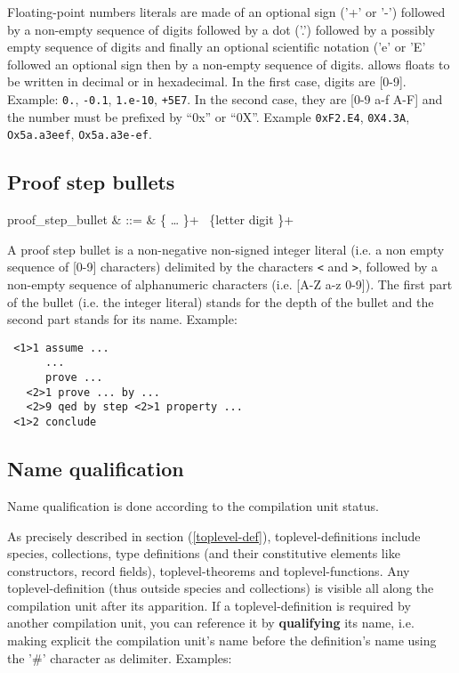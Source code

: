 Floating-point numbers literals are made of an optional sign ('+' or
'-') followed by a non-empty sequence of digits followed by a dot
('.') followed by a possibly empty sequence of digits and finally an
optional scientific notation ('e' or 'E' followed an optional sign
then by a non-empty sequence of digits. {\focal} allows floats to be
written in decimal or in hexadecimal. In the first case, digits are
[0-9]. Example: {\tt 0.}, {\tt -0.1}, {\tt 1.e-10}, {\tt +5E7}.
In the second case, they are [0-9 a-f A-F] and the number must be
prefixed by ``0x'' or ``0X''. Example {\tt 0xF2.E4}, {\tt 0X4.3A},
{\tt Ox5a.a3eef}, {\tt Ox5a.a3e-ef}.

\subsection{Proof step bullets}
\begin{syntax}
proof\_step\_bullet & ::= &
   \terminal{<} \{  \ldots {} \}+ \terminal{>}
   \ \{letter \mid digit \}+
\end{syntax}

A proof step bullet is a non-negative non-signed integer literal
(i.e. a non empty sequence of [0-9] characters) delimited by the
characters {\tt <} and {\tt >}, followed by a non-empty sequence of
alphanumeric characters (i.e. [A-Z a-z 0-9]).
The first part of the bullet (i.e. the integer literal) stands for the
depth of the bullet and the second part stands for its name. Example:
{\scriptsize
\begin{lstlisting}
 <1>1 assume ...
      ...
      prove ...
   <2>1 prove ... by ...
   <2>9 qed by step <2>1 property ...
 <1>2 conclude
\end{lstlisting}
}

\subsection{Name qualification}
\label{qualified-name}
 

Name qualification is done according to the
compilation unit status.

As precisely described in section (\ref{toplevel-def}),
toplevel-definitions include species, collections, type definitions
(and their constitutive elements like constructors, record fields),
toplevel-theorems and toplevel-functions.  Any toplevel-definition (thus
outside species and collections) is visible all along the compilation unit
after its apparition.
If a toplevel-definition is required by another compilation unit, you can
reference it by {\bf qualifying} its name, i.e. making explicit the
compilation unit's name before the definition's name using the '\#'
character as delimiter. Examples:

